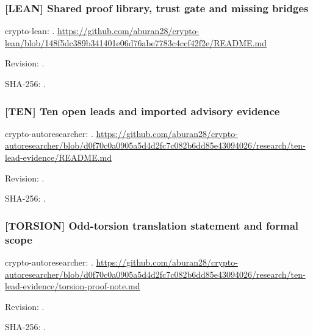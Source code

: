 \par\noindent\begin{minipage}{\linewidth}\small
\subsubsection*{[LEAN] Shared proof library, trust gate and missing bridges}\label{art:LEAN}
crypto-lean: .
\url{https://github.com/aburan28/crypto-lean/blob/148f5dc389b341401e06d76abe7783c4ccf42f2e/README.md}
\par Revision: .
\par SHA-256: .
\end{minipage}\par\medskip

\par\noindent\begin{minipage}{\linewidth}\small
\subsubsection*{[TEN] Ten open leads and imported advisory evidence}\label{art:TEN}
crypto-autoresearcher: .
\url{https://github.com/aburan28/crypto-autoresearcher/blob/d0f70c0a0905a5d4d2fc7c082b6dd85e43094026/research/ten-lead-evidence/README.md}
\par Revision: .
\par SHA-256: .
\end{minipage}\par\medskip

\par\noindent\begin{minipage}{\linewidth}\small
\subsubsection*{[TORSION] Odd-torsion translation statement and formal scope}\label{art:TORSION}
crypto-autoresearcher: .
\url{https://github.com/aburan28/crypto-autoresearcher/blob/d0f70c0a0905a5d4d2fc7c082b6dd85e43094026/research/ten-lead-evidence/torsion-proof-note.md}
\par Revision: .
\par SHA-256: .
\end{minipage}\par\medskip

